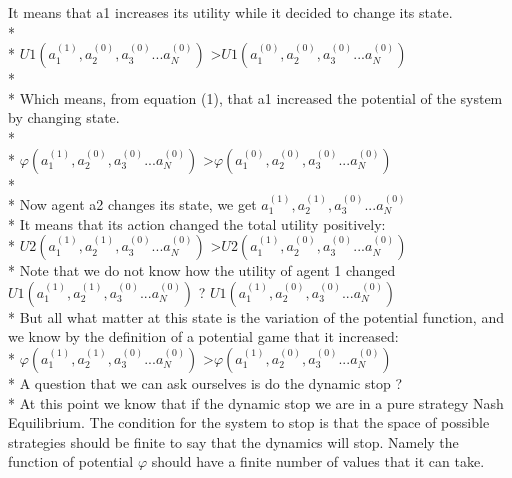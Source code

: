 It means that a1 increases its utility while it decided to change its state. \\* \\*
\hspace*{20pt} $U1(a_1^{(1)},a_2^{(0)},a_3^{(0)}...a_N^{(0)})$  \textgreater $U1(a_1^{(0)},a_2^{(0)},a_3^{(0)}...a_N^{(0)})$  \\* \\*
Which means, from equation (1), that a1 increased the potential of the system by changing state. \\* \\*
\hspace*{20pt} $\varphi(a_1^{(1)},a_2^{(0)},a_3^{(0)}...a_N^{(0)})$ \textgreater $\varphi(a_1^{(0)},a_2^{(0)},a_3^{(0)}...a_N^{(0)})$ \\* \\*
Now agent a2 changes its state, we get \hspace{5pt} $a_1^{(1)},a_2^{(1)},a_3^{(0)}...a_N^{(0)}$
\\* 
It means that its action changed the total utility positively: \\*
$U2(a_1^{(1)},a_2^{(1)},a_3^{(0)}...a_N^{(0)})$ \textgreater $U2(a_1^{(1)},a_2^{(0)},a_3^{(0)}...a_N^{(0)})$ \\*
Note that we do not know how the utility of agent 1 changed $U1(a_1^{(1)},a_2^{(1)},a_3^{(0)}...a_N^{(0)})$ ? $U1(a_1^{(1)},a_2^{(0)},a_3^{(0)}...a_N^{(0)})$  \\*
But all what matter at this state is the variation of the potential function, and we know by the definition of a potential game that it increased: \\*
$\varphi(a_1^{(1)},a_2^{(1)},a_3^{(0)}...a_N^{(0)})$ \textgreater $\varphi(a_1^{(1)},a_2^{(0)},a_3^{(0)}...a_N^{(0)})$ \\*
A question that we can ask ourselves is do the dynamic stop ? \\*
At this point we know that if the dynamic stop we are in a pure strategy Nash Equilibrium. The condition for the system to stop is that the space of possible strategies should be finite to say that the dynamics will stop. Namely the function of potential $\varphi$ should have a finite number of values that it can take. 
